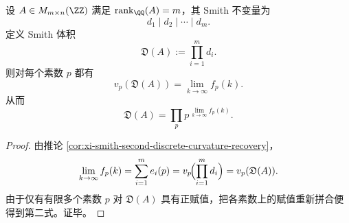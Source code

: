 \begin{corollary}\label{cor:xi-smith-volume-recovered-from-padic-platform}
设 \(A\in M_{m\times n}(\ZZ)\) 满足 \(\operatorname{rank}_{\QQ}(A)=m\)，其 Smith 不变量为
\[
d_1\mid d_2\mid\cdots\mid d_m.
\]
定义 Smith 体积
\[
\mathfrak D(A):=\prod_{i=1}^{m}d_i.
\]
则对每个素数 \(p\) 都有
\[
\boxed{\;
v_p(\mathfrak D(A))
=
\lim_{k\to\infty}f_p(k).\;}
\]
从而
\[
\boxed{\;
\mathfrak D(A)=\prod_{p}p^{\,\lim_{k\to\infty}f_p(k)}.\;}
\]
\end{corollary}
\begin{proof}
由推论 \ref{cor:xi-smith-second-discrete-curvature-recovery}，
\[
\lim_{k\to\infty}f_p(k)=\sum_{i=1}^{m}e_i(p)
=
v_p\!\Bigl(\prod_{i=1}^{m}d_i\Bigr)
=
v_p(\mathfrak D(A)).
\]
由于仅有有限多个素数 \(p\) 对 \(\mathfrak D(A)\) 具有正赋值，把各素数上的赋值重新拼合便得到第二式。证毕。
\end{proof}

\endinput
